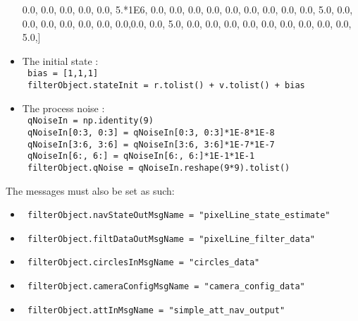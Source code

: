 \begin{itemize}
{                              0.0, 0.0, 0.0, 0.0, 0.0, 5.*1E6, 0.0, 0.0, 0.0,
                              0.0, 0.0, 0.0, 0.0, 0.0, 0.0, 5.0, 0.0, 0.0,
                              0.0, 0.0, 0.0, 0.0, 0.0,0.0, 0.0, 5.0, 0.0,
                              0.0, 0.0, 0.0, 0.0, 0.0, 0.0, 0.0, 0.0, 5.0,]}
 \item The initial state :\\
  \texttt{     bias = [1,1,1] } \\ 
  \texttt{      filterObject.stateInit = r.tolist() + v.tolist() + bias }
    \item The process noise :\\
  \texttt{     qNoiseIn = np.identity(9)} \\
  \texttt{     qNoiseIn[0:3, 0:3] = qNoiseIn[0:3, 0:3]*1E-8*1E-8} \\
  \texttt{     qNoiseIn[3:6, 3:6] = qNoiseIn[3:6, 3:6]*1E-7*1E-7} \\
  \texttt{     qNoiseIn[6:, 6:] = qNoiseIn[6:, 6:]*1E-1*1E-1} \\
  \texttt{     filterObject.qNoise = qNoiseIn.reshape(9*9).tolist()}
\end{itemize}

The messages must also be set as such:

\begin{itemize}
 \item    \texttt{   filterObject.navStateOutMsgName = "pixelLine\_state\_estimate"}
 \item    \texttt{   filterObject.filtDataOutMsgName = "pixelLine\_filter\_data"}
 \item    \texttt{   filterObject.circlesInMsgName = "circles\_data"}
 \item    \texttt{   filterObject.cameraConfigMsgName = "camera\_config\_data"}
 \item    \texttt{   filterObject.attInMsgName = "simple\_att\_nav\_output"}
\end{itemize}

